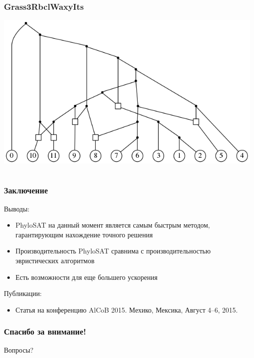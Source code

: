 \documentclass[hyperref={unicode}]{beamer}
\begin{document}
\begin{frame}
\frametitle{Grass3RbclWaxyIts}

\includegraphics[width=\linewidth]{img/Grass3RbclWaxyIts}
	
\end{frame}

\section{}

\begin{frame}
\frametitle{Заключение}

Выводы:
\begin{itemize}
	\item PhyloSAT на данный момент является самым быстрым методом, гарантирующим нахождение точного решения
	\item Производительность PhyloSAT сравнима с производительностью эвристических алгоритмов
	\item Есть возможности для еще большего ускорения
\end{itemize}

Публикации:
\begin{itemize}
	\item Статья на конференцию AlCoB 2015. Мехико, Мексика, Август 4--6, 2015.
\end{itemize}

\end{frame}

\begin{frame}
\frametitle{Спасибо за внимание!}

Вопросы?

\end{frame}
\end{document}
